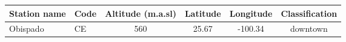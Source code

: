 \begin{table}[H]
    \begin{tabular}{llcccc} \hline
        Station name   & Code & Altitude (m.a.sl) & Latitude & Longitude & Classification  \\ \hline
        Obispado       & CE   & 560               & 25.67    & -100.34   & downtown        \\

\end{tabular}
\end{table}
